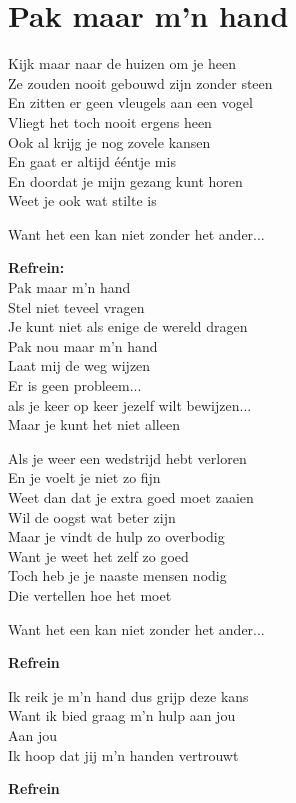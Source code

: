 \section{Pak maar m'n hand}
Kijk maar naar de huizen om je heen\\
Ze zouden nooit gebouwd zijn zonder steen\\
En zitten er geen vleugels aan een vogel\\
Vliegt het toch nooit ergens heen\\
Ook al krijg je nog zovele kansen\\
En gaat er altijd ééntje mis\\
En doordat je mijn gezang kunt horen\\
Weet je ook wat stilte is

Want het een kan niet zonder het ander...

\textbf{Refrein:}\\
Pak maar m'n hand\\
Stel niet teveel vragen\\
Je kunt niet als enige de wereld dragen\\
Pak nou maar m'n hand\\
Laat mij de weg wijzen\\
Er is geen probleem...\\
als je keer op keer jezelf wilt bewijzen...\\
Maar je kunt het niet alleen

Als je weer een wedstrijd hebt verloren\\
En je voelt je niet zo fijn\\
Weet dan dat je extra goed moet zaaien\\
Wil de oogst wat beter zijn\\
Maar je vindt de hulp zo overbodig\\
Want je weet het zelf zo goed\\
Toch heb je je naaste mensen nodig\\
Die vertellen hoe het moet

Want het een kan niet zonder het ander...

\textbf{Refrein}

Ik reik je m'n hand dus grijp deze kans\\
Want ik bied graag m'n hulp aan jou\\
Aan jou\\
Ik hoop dat jij m'n handen vertrouwt

\textbf{Refrein}